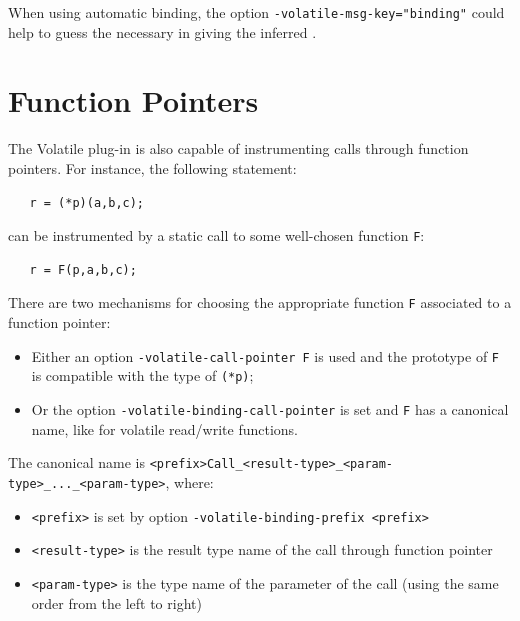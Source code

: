 \documentclass{frama-c-book}
\begin{document}
When using automatic binding, the option \verb|-volatile-msg-key="binding"| could help to guess the necessary {\sl <function-name>} in giving the inferred {\sl <type-name>}.

\chapter{Function Pointers}

The Volatile plug-in is also capable of instrumenting calls through function pointers.
For instance, the following statement:
\begin{verbatim}
   r = (*p)(a,b,c);
\end{verbatim}
can be instrumented by a static call to some well-chosen function \verb+F+:
\begin{verbatim}
   r = F(p,a,b,c);
\end{verbatim}

There are two mechanisms for choosing the appropriate function \verb+F+ associated to a function pointer:
\begin{itemize}
\item Either an option \verb+-volatile-call-pointer F+ is used and the prototype of \verb+F+ is compatible with
  the type of \verb+(*p)+;
\item Or the option \verb+-volatile-binding-call-pointer+ is set and \verb+F+ has a canonical name, like for volatile read/write functions.
\end{itemize}

The canonical name is \verb+<prefix>Call_<result-type>_<param-type>_..._<param-type>+, where:
\begin{itemize}
\item \verb+<prefix>+ is set by option \verb+-volatile-binding-prefix <prefix>+
\item \verb+<result-type>+ is the result type name of the call through function pointer
\item \verb+<param-type>+ is the type name of the parameter of the call (using the same order from the left to right)
\end{itemize}

\appendix





\cleardoublepage
\end{document}
